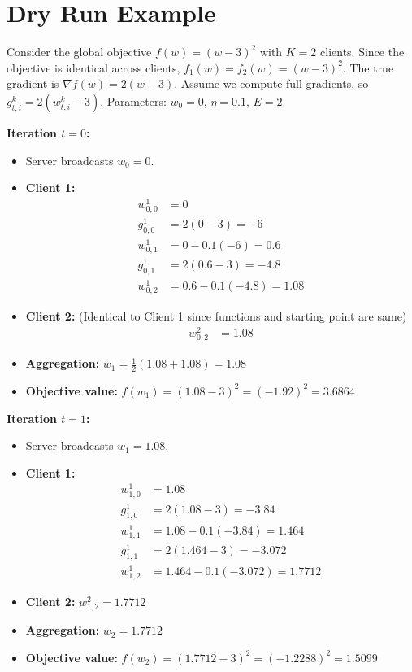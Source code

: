 \documentclass{article}
\begin{document}
\section*{Dry Run Example}
Consider the global objective $f(w) = (w-3)^2$ with $K=2$ clients. Since the objective is identical across clients, $f_1(w) = f_2(w) = (w-3)^2$. The true gradient is $\nabla f(w) = 2(w-3)$. Assume we compute full gradients, so $g_{t,i}^k = 2(w_{t,i}^k - 3)$. Parameters: $w_0 = 0$, $\eta = 0.1$, $E = 2$.

\textbf{Iteration $t=0$:}
\begin{itemize}
\item Server broadcasts $w_0 = 0$.
\item \textbf{Client 1:}
\begin{align*}
w_{0,0}^1 &= 0 \\
g_{0,0}^1 &= 2(0 - 3) = -6 \\
w_{0,1}^1 &= 0 - 0.1(-6) = 0.6 \\
g_{0,1}^1 &= 2(0.6 - 3) = -4.8 \\
w_{0,2}^1 &= 0.6 - 0.1(-4.8) = 1.08
\end{align*}
\item \textbf{Client 2:} (Identical to Client 1 since functions and starting point are same)
\begin{align*}
w_{0,2}^2 &= 1.08
\end{align*}
\item \textbf{Aggregation:} $w_1 = \frac{1}{2}(1.08 + 1.08) = 1.08$
\item \textbf{Objective value:} $f(w_1) = (1.08 - 3)^2 = (-1.92)^2 = 3.6864$
\end{itemize}

\textbf{Iteration $t=1$:}
\begin{itemize}
\item Server broadcasts $w_1 = 1.08$.
\item \textbf{Client 1:}
\begin{align*}
w_{1,0}^1 &= 1.08 \\
g_{1,0}^1 &= 2(1.08 - 3) = -3.84 \\
w_{1,1}^1 &= 1.08 - 0.1(-3.84) = 1.464 \\
g_{1,1}^1 &= 2(1.464 - 3) = -3.072 \\
w_{1,2}^1 &= 1.464 - 0.1(-3.072) = 1.7712
\end{align*}
\item \textbf{Client 2:} $w_{1,2}^2 = 1.7712$
\item \textbf{Aggregation:} $w_2 = 1.7712$
\item \textbf{Objective value:} $f(w_2) = (1.7712 - 3)^2 = (-1.2288)^2 = 1.5099$
\end{itemize}
\end{document}
